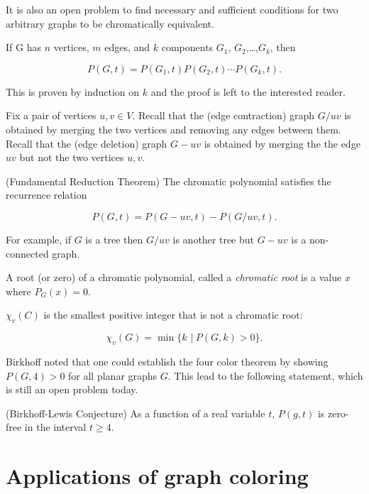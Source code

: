 It is also an open problem to find necessary and sufficient conditions
for two arbitrary graphs to be chromatically equivalent.

\begin{theorem}
If G has $n$ vertices, $m$ edges, and $k$ components $G_1$,
$G_2$,\dots ,$G_k$, then

\[
P(G, t) = P(G_1, t)P(G_2,t) \cdots P(G_k,t).
\]
\end{theorem}

This is proven by induction on $k$ and the proof is left to the 
interested reader.

Fix a pair of vertices $u, v\in V$.
Recall that the (edge contraction) 
graph $G/uv$ is obtained by merging the two vertices and removing 
any edges between them. Recall that the (edge deletion)
graph $G-uv$ is obtained by merging the the edge $uv$ but not the
two vertices $u,v$.

\begin{theorem}
(Fundamental Reduction Theorem)
The chromatic polynomial satisfies the recurrence relation

\[
    P(G,t) = P(G-uv, t) - P(G/uv,t) .
\]
\end{theorem}

For example, if $G$ is a tree then $ G/uv$ is another tree
but $ G-uv$ is a non-connected graph.

A root (or zero) of a chromatic polynomial, called a {\it chromatic root}
is a value $x$ where $P_G(x)=0$. 

\begin{theorem}  
$\chi_v(C)$ is the smallest positive integer that is not a chromatic root:

\[
    \chi_v (G)=\min\{ k\,\ |\ P(G,k) > 0 \}. 
\]
\end{theorem}

Birkhoff noted that one could establish the four color theorem by
showing $P(G,4)>0$ for all planar graphs $G$. This lead to the
following statement, which is still an open problem today.

\begin{conjecture}
(Birkhoff-Lewis Conjecture) 
As a function of a real variable $t$, $P(g,t)$ is zero-free in the
interval $t\geq 4$.
\end{conjecture}




\section{Applications of graph coloring}

